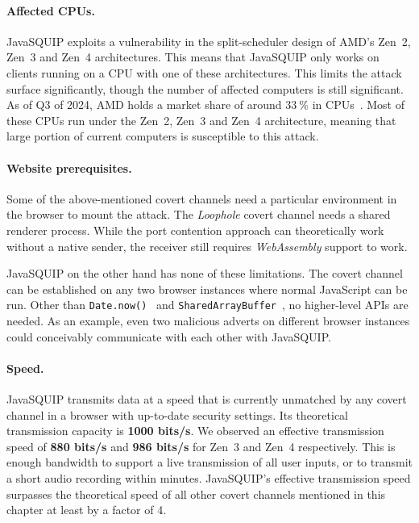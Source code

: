 \documentclass[11pt,
  titlepage=false,
  parskip=half,      %
]{scrreprt}
\begin{document}
\paragraph{Affected CPUs.}
JavaSQUIP exploits a vulnerability in the split-scheduler design of AMD's Zen~2, Zen~3 and Zen~4 architectures.
This means that JavaSQUIP only works on clients running on a CPU with one of these architectures.
This limits the attack surface significantly, though the number of affected computers is still significant.
As of Q3 of 2024, AMD holds a market share of around $33~\%$ in CPUs~\cite{amdmarket}.
Most of these CPUs run under the Zen~2, Zen~3 and Zen~4 architecture,
meaning that large portion of current computers is susceptible to this attack.

\paragraph{Website prerequisites.}
Some of the above-mentioned covert channels need a particular environment in the browser to mount the attack.
The \textit{Loophole} covert channel needs a shared renderer process.
While the port contention approach can theoretically work without a native sender,
the receiver still requires \textit{WebAssembly} support to work.

JavaSQUIP on the other hand has none of these limitations.
The covert channel can be established on any two browser instances where normal JavaScript can be run.
Other than \texttt{Date.now()}~\cite{datenow} and \texttt{SharedArrayBuffer}~\cite{sharedarraybuffer},
no higher-level APIs are needed.
As an example, even two malicious adverts on different browser instances could conceivably communicate with each other
with JavaSQUIP.

\paragraph{Speed.}
JavaSQUIP transmits data at a speed that is currently unmatched by any covert channel in a browser with up-to-date security settings.
Its theoretical transmission capacity is \textbf{1000 bits/s}.
We observed an effective transmission speed of \textbf{880 bits/s} and \textbf{986 bits/s} for Zen~3 and Zen~4 respectively.
This is enough bandwidth to support a live transmission of all user inputs, or to transmit a short audio recording within minutes.
JavaSQUIP's effective transmission speed surpasses the theoretical speed of all other covert channels mentioned in this chapter at least by a factor of 4.
\end{document}
